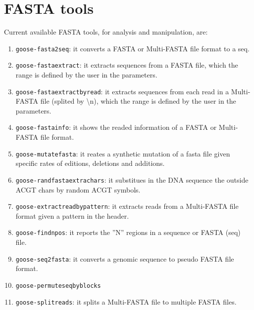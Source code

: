 \chapter{FASTA tools}
\label{fasta}

Current available FASTA tools, for analysis and manipulation, are:
\begin{enumerate}
\item \texttt{goose-fasta2seq}: it converts a FASTA or Multi-FASTA file format to a seq.
\item \texttt{goose-fastaextract}: it extracts sequences from a FASTA file, which the range is defined by the user in the parameters.
\item \texttt{goose-fastaextractbyread}: it extracts sequences from each read in a Multi-FASTA file (splited by \textbackslash n), which the range is defined by the user in the parameters.
\item \texttt{goose-fastainfo}: it shows the readed information of a FASTA or Multi-FASTA file format.
\item \texttt{goose-mutatefasta}: it reates a synthetic mutation of a fasta file given specific rates of editions, deletions and additions.
\item \texttt{goose-randfastaextrachars}: it substitues in the DNA sequence the outside ACGT chars by random ACGT symbols.
\item \texttt{goose-extractreadbypattern}: it extracts reads from a Multi-FASTA file format given a pattern in the header.
\item \texttt{goose-findnpos}: it reports the ''N'' regions in a sequence or FASTA (seq) file.
\item \texttt{goose-seq2fasta}: it converts a genomic sequence to pseudo FASTA file format.
\item \texttt{goose-permuteseqbyblocks}
\item \texttt{goose-splitreads}: it splits a Multi-FASTA file to multiple FASTA files.

\end{enumerate}




 





%



